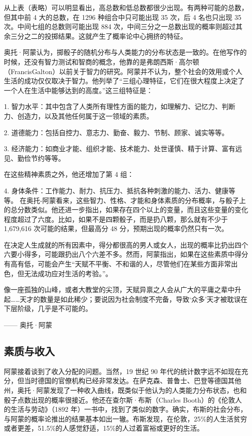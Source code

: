 从上表（表略）可以明显看出，高总数和低总数都很少出现。有两种可能的总数，但其中前 4 大的总数，在 1296 种组合中只可能出现 35 次，后 4 名也只出现 35次。中间七组的总数则可能出现 884 次，中间三分之一总数出现的概率则超过其余三分之二的投掷结果。这就产生了概率论中心拥挤的特征。

奥托·阿蒙认为，掷骰子的随机分布与人类能力的分布状态是一致的。在他写作的时候，还没有智力测试和智商的概念，他靠的是弗朗西斯·高尔顿（FrancisGalton）以前关于智力的研究。阿蒙并不认为，整个社会的效用或个人生活的成功仅仅取决于智力。他列举了“三组心理特征，它们在很大程度上决定了一个人在生活中能够达到的高度。”这三组特征是：

1. 智力水平：其中包含了人类所有理性方面的能力，如理解力、记忆力、判断力、创造力，以及其他任何属于这一领域的素质。

2. 道德能力：包括自控力、意志力、勤奋、毅力、节制、顾家、诚实等等。

3. 经济能力：如商业才能、组织才能、技术能力、处世谨慎、精于计算、富有远见、勤俭节约等等。 

在这些精神素质之外，他还增加了第 4 组：

4. 身体条件：工作能力、耐力、抗压力、抵抗各种刺激的能力、活力、健康等等。 在奥托-阿蒙看来，这些智力、性格、才能和身体素质的分布概率，与骰子上的总分数类似。他还进一步指出，如果存在四个以上的变量，而且这些变量的变化程度超过了六度。比如，如果不是四颗骰子，而是扔八颗，那么就有不少于1,679,616 次可能的结果，但最高分 48 分，预期出现的概率仍然只有一次。

在决定人生成就的所有因素中，得分都很高的男人或女人，出现的概率比扔出四个六要小得多，可能跟扔出八个六差不多。然而，阿蒙指出，如果在这些素质中得分有高有低，可能会产生“天赋不平衡、不和谐的人，尽管他们在某些方面非常出色，但无法成功应对生活的考验。”。

\begin{tcolorbox}
像一座孤独的山峰，或者大教堂的尖顶，天赋异禀之人会从广大的平庸之辈中升起……天才的数量是如此稀少；要说因为社会制度不完备，导致‘众多’天才被耽误在下层阶级，几乎是不可能的。
\begin{flushright}
—— 奥托·阿蒙
\end{flushright}
\end{tcolorbox}


\subsection{素质与收入}
阿蒙接着谈到了收入分配的问题。当然，19 世纪 90 年代的统计数字远不如现在充分，但当时德国的官僚机构已经非常发达。在萨克森、普鲁士、巴登等德国其他州，奥托·阿蒙发现了一种收入曲线，既类似于他认为的人类能力分布状态，也和骰子点数出现的概率很接近。他还在查尔斯·布斯（Charles Booth）的《伦敦人的生活与劳动》（1892 年）一书中，找到了类似的数字。确实，布斯的社会分布，与阿蒙的概率论推出的结果基本如出一辙。布斯发现，在伦敦，25\%的人生活贫穷或者更差，51.5\%的人感觉舒适，15\%的人过着富裕或更好的生活。

